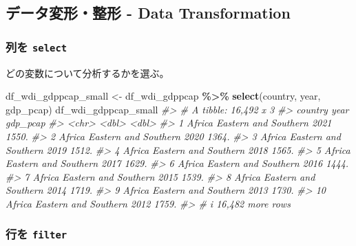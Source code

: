 \documentclass[
  xelatex, ja=standard]{bxjsbook}
\newenvironment{Shaded}{\begin{snugshade}}{\end{snugshade}}
\newcommand{\CommentTok}[1]{\textcolor[rgb]{0.56,0.35,0.01}{\textit{#1}}}
\newcommand{\FunctionTok}[1]{\textcolor[rgb]{0.13,0.29,0.53}{\textbf{#1}}}
\newcommand{\NormalTok}[1]{#1}
\newcommand{\OtherTok}[1]{\textcolor[rgb]{0.56,0.35,0.01}{#1}}
\newcommand{\SpecialCharTok}[1]{\textcolor[rgb]{0.81,0.36,0.00}{\textbf{#1}}}
\theoremstyle{definition}
\theoremstyle{definition}
\theoremstyle{definition}
\theoremstyle{definition}
\theoremstyle{remark}
\begin{document}
\hypertarget{ux30c7ux30fcux30bfux5909ux5f62ux6574ux5f62---data-transformation}{%
\subsection{データ変形・整形 - Data Transformation}\label{ux30c7ux30fcux30bfux5909ux5f62ux6574ux5f62---data-transformation}}

\hypertarget{ux5217ux3092-select}{%
\subsubsection{\texorpdfstring{列を \texttt{select}}{列を select}}\label{ux5217ux3092-select}}

どの変数について分析するかを選ぶ。

\begin{Shaded}
\begin{Highlighting}[]
\NormalTok{df\_wdi\_gdppcap\_small }\OtherTok{\textless{}{-}}\NormalTok{ df\_wdi\_gdppcap }\SpecialCharTok{\%\textgreater{}\%} 
  \FunctionTok{select}\NormalTok{(country, year, gdp\_pcap)}
\NormalTok{df\_wdi\_gdppcap\_small}
\CommentTok{\#\textgreater{} \# A tibble: 16,492 x 3}
\CommentTok{\#\textgreater{}    country                      year gdp\_pcap}
\CommentTok{\#\textgreater{}    \textless{}chr\textgreater{}                       \textless{}dbl\textgreater{}    \textless{}dbl\textgreater{}}
\CommentTok{\#\textgreater{}  1 Africa Eastern and Southern  2021    1550.}
\CommentTok{\#\textgreater{}  2 Africa Eastern and Southern  2020    1364.}
\CommentTok{\#\textgreater{}  3 Africa Eastern and Southern  2019    1512.}
\CommentTok{\#\textgreater{}  4 Africa Eastern and Southern  2018    1565.}
\CommentTok{\#\textgreater{}  5 Africa Eastern and Southern  2017    1629.}
\CommentTok{\#\textgreater{}  6 Africa Eastern and Southern  2016    1444.}
\CommentTok{\#\textgreater{}  7 Africa Eastern and Southern  2015    1539.}
\CommentTok{\#\textgreater{}  8 Africa Eastern and Southern  2014    1719.}
\CommentTok{\#\textgreater{}  9 Africa Eastern and Southern  2013    1730.}
\CommentTok{\#\textgreater{} 10 Africa Eastern and Southern  2012    1759.}
\CommentTok{\#\textgreater{} \# i 16,482 more rows}
\end{Highlighting}
\end{Shaded}

\hypertarget{ux884cux3092-filter}{%
\subsubsection{\texorpdfstring{行を \texttt{filter}}{行を filter}}\label{ux884cux3092-filter}}
\end{document}
